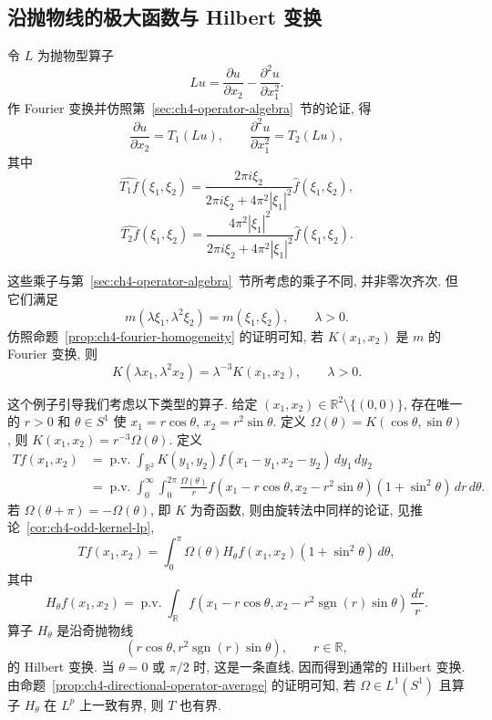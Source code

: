 \subsection{沿抛物线的极大函数与 Hilbert 变换}
\label{sec:ch8-parabola-maximal-hilbert}

令 $L$ 为抛物型算子
\[
 Lu=\frac{\partial u}{\partial x_2}-\frac{\partial^2u}{\partial x_1^2}.
\]
作 Fourier 变换并仿照第~\ref{sec:ch4-operator-algebra}~节的论证, 得
\[
 \frac{\partial u}{\partial x_2}=T_1(Lu),
 \qquad
 \frac{\partial^2u}{\partial x_1^2}=T_2(Lu),
\]
其中
\[
 \widehat{T_1f}(\xi_1,\xi_2)
 =\frac{2\pi i\xi_2}{2\pi i\xi_2+4\pi^2|\xi_1|^2}\widehat f(\xi_1,\xi_2),
\]
\[
 \widehat{T_2f}(\xi_1,\xi_2)
 =\frac{4\pi^2|\xi_1|^2}{2\pi i\xi_2+4\pi^2|\xi_1|^2}\widehat f(\xi_1,\xi_2).
\]

\hypertarget{chapter-08-page-191}{}
这些乘子与第~\ref{sec:ch4-operator-algebra}~节所考虑的乘子不同, 并非零次齐次. 但它们满足
\[
 m(\lambda\xi_1,\lambda^2\xi_2)=m(\xi_1,\xi_2),
 \qquad \lambda>0.
\]
仿照命题~\ref{prop:ch4-fourier-homogeneity} 的证明可知, 若 $K(x_1,x_2)$ 是 $m$ 的 Fourier 变换, 则
\[
 K(\lambda x_1,\lambda^2x_2)=\lambda^{-3}K(x_1,x_2),
 \qquad \lambda>0.
\]

这个例子引导我们考虑以下类型的算子. 给定 $(x_1,x_2)\in\mathbb R^2\setminus\{(0,0)\}$, 存在唯一的 $r>0$ 和 $\theta\in S^1$ 使 $x_1=r\cos\theta$, $x_2=r^2\sin\theta$. 定义 $\Omega(\theta)=K(\cos\theta,\sin\theta)$, 则 $K(x_1,x_2)=r^{-3}\Omega(\theta)$. 定义
\[
 \begin{aligned}
 Tf(x_1,x_2)
 &=\operatorname{p.v.}\int_{\mathbb R^2}K(y_1,y_2)
 f(x_1-y_1,x_2-y_2)\,dy_1\,dy_2\\
 &=\operatorname{p.v.}\int_0^\infty\int_0^{2\pi}
 \frac{\Omega(\theta)}r
 f(x_1-r\cos\theta,x_2-r^2\sin\theta)
 (1+\sin^2\theta)\,dr\,d\theta.
 \end{aligned}
\]
若 $\Omega(\theta+\pi)=-\Omega(\theta)$, 即 $K$ 为奇函数, 则由旋转法中同样的论证, 见推论~\ref{cor:ch4-odd-kernel-lp},
\[
 Tf(x_1,x_2)=\int_0^\pi\Omega(\theta)H_\theta f(x_1,x_2)
 (1+\sin^2\theta)\,d\theta,
\]
其中
\[
 H_\theta f(x_1,x_2)=\operatorname{p.v.}\int_{\mathbb R}
 f(x_1-r\cos\theta,x_2-r^2\operatorname{sgn}(r)\sin\theta)\,\frac{dr}{r}.
\]
算子 $H_\theta$ 是沿奇抛物线
\[
 (r\cos\theta,r^2\operatorname{sgn}(r)\sin\theta),
 \qquad r\in\mathbb R,
\]
的 Hilbert 变换. 当 $\theta=0$ 或 $\pi/2$ 时, 这是一条直线, 因而得到通常的 Hilbert 变换. 由命题~\ref{prop:ch4-directional-operator-average} 的证明可知, 若 $\Omega\in L^1(S^1)$ 且算子 $H_\theta$ 在 $L^p$ 上一致有界, 则 $T$ 也有界.

